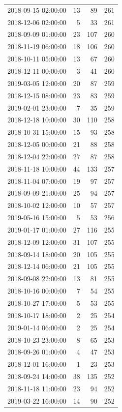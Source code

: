 \begin{tabular}{lrrr}
2018-09-15 02:00:00 & 13 & 89 & 261 \\
2018-12-06 02:00:00 & 5 & 33 & 261 \\
2018-09-09 01:00:00 & 23 & 107 & 260 \\
2018-11-19 06:00:00 & 18 & 106 & 260 \\
2018-10-11 05:00:00 & 13 & 67 & 260 \\
2018-12-11 00:00:00 & 3 & 41 & 260 \\
2019-03-05 12:00:00 & 20 & 87 & 259 \\
2018-12-15 08:00:00 & 23 & 83 & 259 \\
2019-02-01 23:00:00 & 7 & 35 & 259 \\
2018-12-18 10:00:00 & 30 & 110 & 258 \\
2018-10-31 15:00:00 & 15 & 93 & 258 \\
2018-12-05 00:00:00 & 21 & 88 & 258 \\
2018-12-04 22:00:00 & 27 & 87 & 258 \\
2018-11-18 10:00:00 & 44 & 133 & 257 \\
2018-11-04 07:00:00 & 19 & 97 & 257 \\
2018-09-09 21:00:00 & 25 & 94 & 257 \\
2018-10-02 12:00:00 & 10 & 57 & 257 \\
2019-05-16 15:00:00 & 5 & 53 & 256 \\
2019-01-17 01:00:00 & 27 & 116 & 255 \\
2018-12-09 12:00:00 & 31 & 107 & 255 \\
2018-09-14 18:00:00 & 20 & 105 & 255 \\
2018-12-14 06:00:00 & 21 & 105 & 255 \\
2018-09-08 22:00:00 & 13 & 81 & 255 \\
2018-10-16 00:00:00 & 7 & 54 & 255 \\
2018-10-27 17:00:00 & 5 & 53 & 255 \\
2018-10-17 18:00:00 & 2 & 25 & 254 \\
2019-01-14 06:00:00 & 2 & 25 & 254 \\
2018-10-23 23:00:00 & 8 & 65 & 253 \\
2018-09-26 01:00:00 & 4 & 47 & 253 \\
2018-12-01 16:00:00 & 1 & 23 & 253 \\
2018-09-24 14:00:00 & 38 & 135 & 252 \\
2018-11-18 11:00:00 & 23 & 94 & 252 \\
2019-03-22 16:00:00 & 14 & 90 & 252 \\

\end{tabular}
